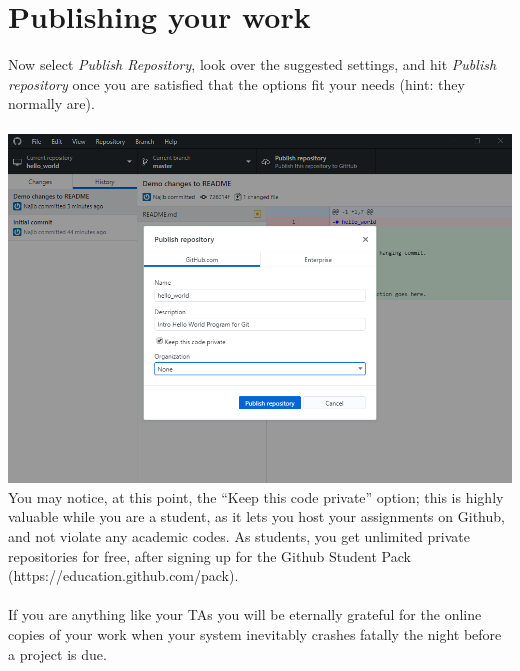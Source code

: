 \documentclass[12pt, letter]{article}
\begin{document}
    \section{Publishing your work}
    Now select \emph{Publish Repository}, look over the suggested settings, and hit \emph{Publish repository} once you are satisfied that the options fit your needs (hint: they normally are). \\ \\ %
    \includegraphics{screenshots/shot6.bmp}
    \\
    You may notice, at this point, the ``Keep this code private'' option; this is highly valuable while you are a student, as it lets you host your assignments on Github, and not violate any academic codes. As students, you get unlimited private repositories for free, after signing up for the Github Student Pack (https://education.github.com/pack).
    \\ \\
    If you are anything like your TAs you will be eternally grateful for the online copies of your work when your system inevitably crashes fatally the night before a project is due.
\end{document}

